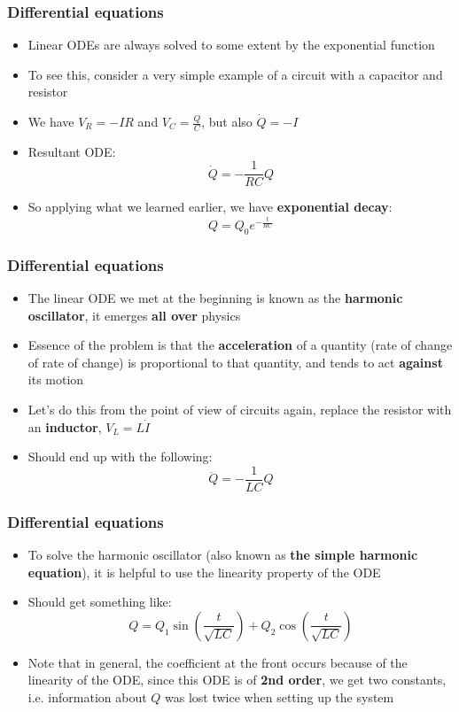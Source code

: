\documentclass{beamer}
\begin{document}
\begin{frame}
  \frametitle{Differential equations}
  \begin{itemize}
    \item<1-> Linear ODEs are always solved to some extent by the exponential function
    \item<2-> To see this, consider a very simple example of a circuit with a capacitor and resistor
    \item<3-> We have $V_R=-IR$ and $V_C=\frac{Q}{C}$, but also $\dot{Q}=-I$
    \item<4-> Resultant ODE:
      \begin{equation*}
	\dot{Q}=-\frac{1}{RC}Q	
      \end{equation*}
    \item<5-> So applying what we learned earlier, we have \textbf{exponential decay}:
      \begin{equation*}
	Q=Q_0e^{-\frac{t}{RC}}
      \end{equation*}
  \end{itemize}
\end{frame}

\begin{frame}
  \frametitle{Differential equations}
  \begin{itemize}
    \item<1-> The linear ODE we met at the beginning is known as the \textbf{harmonic oscillator}, it emerges \textbf{all over} physics
    \item<2-> Essence of the problem is that the \textbf{acceleration} of a quantity (rate of change of rate of change) is proportional to that quantity, and tends to act \textbf{against} its motion
    \item<3-> Let's do this from the point of view of circuits again, replace the resistor with an \textbf{inductor}, $V_L=L\dot{I}$
    \item<4-> Should end up with the following:
      \begin{equation*}
	\ddot{Q}=-\frac{1}{LC}Q 
      \end{equation*}
  \end{itemize}
\end{frame}

\begin{frame}
  \frametitle{Differential equations}
  \begin{itemize}
    \item<1-> To solve the harmonic oscillator (also known as \textbf{the simple harmonic equation}), it is helpful to use the linearity property of the ODE
    \item<2-> Should get something like:
      \begin{equation*}
	Q=Q_1\sin\left(\frac{t}{\sqrt{LC}}\right)+Q_2\cos\left(\frac{t}{\sqrt{LC}}\right)
	\label{<+label+>}
      \end{equation*}
    \item<3-> Note that in general, the coefficient at the front occurs because of the linearity of the ODE, since this ODE is of \textbf{2nd order}, we get two constants, i.e. information about $Q$ was lost twice when setting up the system
  \end{itemize}
\end{frame}
\end{document}
